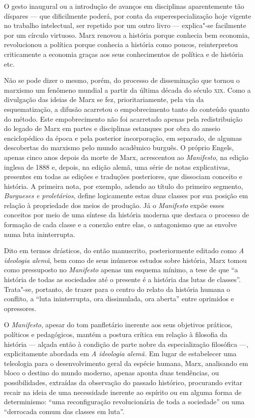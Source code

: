 O gesto inaugural ou a introdução de avanços em disciplinas
aparentemente tão díspares --- que dificilmente poderá, por conta da
superespecialização hoje vigente no trabalho intelectual, ser repetido
por um outro livro --- explica"-se facilmente por um círculo virtuoso.
Marx renovou a história porque conhecia bem economia, revolucionou a
política porque conhecia a história como poucos, reinterpretou
criticamente a economia graças aos seus conhecimentos de política e de
história etc.

Não se pode dizer o mesmo, porém, do processo de disseminação que tornou
o marxismo um fenômeno mundial a partir da última década do século \textsc{xix}.
Como a divulgação das ideias de Marx se fez, prioritariamente, pela via da
esquematização, a difusão acarretou o empobrecimento tanto do conteúdo
quanto do método. Este empobrecimento não foi acarretado apenas pela
redistribuição do legado de Marx em partes e disciplinas estanques por
obra do anseio enciclopédico da época e pela posterior incorporação, em
separado, de algumas descobertas do marxismo pelo mundo acadêmico
burguês. O próprio Engels, apenas cinco anos depois da morte de Marx,
acrescentou ao \textit{Manifesto}, na edição inglesa de 1888 e, depois,
na edição alemã, uma série de notas explicativas, presentes em todas as
edições e traduções posteriores, que dissociam conceito e história. A
primeira nota, por exemplo, adendo ao título do primeiro segmento,
\textit{Burgueses e proletários}, define logicamente estas duas classes por
sua posição em relação à propriedade dos meios de produção. Já o
\textit{Manifesto} expõe esses conceitos por meio de uma síntese da
história moderna que destaca o processo de formação de cada classe e a
conexão entre elas, o antagonismo que as envolve numa luta
ininterrupta.

Dito em termos drásticos, do então manuscrito, posteriormente editado
como \textit{A ideologia alemã}, bem como de seus inúmeros estudos
sobre história, Marx tomou como pressuposto no \textit{Manifesto}
apenas um esquema mínimo, a tese de que ``a história de todas as
sociedades até o presente é a história das lutas de classes''.
Trata"-se, portanto, de trazer para o centro do relato da história
humana o conflito, a ``luta ininterrupta, ora dissimulada, ora aberta''
entre oprimidos e opressores.

O \textit{Manifesto}, apesar do tom panfletário inerente aos seus
objetivos práticos, políticos e pedagógicos, mantém a postura crítica
em relação à filosofia da história --- alçada então à condição de parte
nobre da especialização filosófica ---, explicitamente abordada em
\textit{A ideologia alemã.} Em lugar de estabelecer uma teleologia para
o desenvolvimento geral da espécie humana, Marx, analisando em bloco o
destino do mundo moderno, apenas aponta duas tendências, ou
possibilidades, extraídas da observação do passado histórico,
procurando evitar recair na ideia de uma necessidade inerente ao
espírito ou em alguma forma de determinismo: ``uma reconfiguração
revolucionária de toda a sociedade'' ou uma ``derrocada comum das classes
em luta''.

